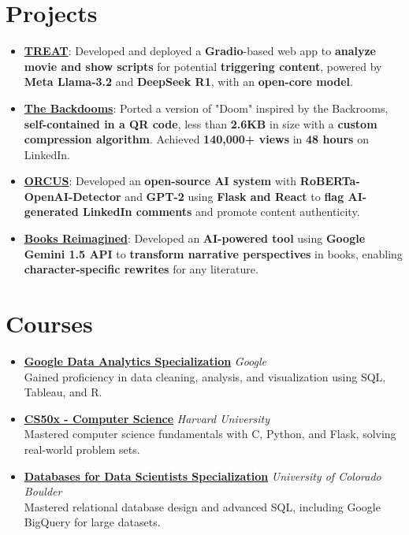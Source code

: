 \documentclass[letterpaper,11pt]{article}
\newcommand{\resumeItem}[2]{
  \item\small{
    \textbf{#1}{: #2 \vspace{-2pt}}
  }
}
\newcommand{\resumeSubHeadingListStart}{\begin{itemize}[leftmargin=*]}
\newcommand{\resumeSubHeadingListEnd}{\end{itemize}}
\begin{document}
\section*{Projects}
\resumeSubHeadingListStart
  \resumeItem{\href{https://trytreat.tech/}{TREAT}}{Developed and deployed a \textbf{Gradio}-based web app to \textbf{analyze movie and show scripts} for potential \textbf{triggering content}, powered by \textbf{Meta Llama-3.2} and \textbf{DeepSeek R1}, with an \textbf{open-core model}.}
  \resumeItem{\href{https://github.com/Kuberwastaken/backdooms}{The Backdooms}}{Ported a version of "Doom" inspired by the Backrooms, \textbf{self-contained in a QR code}, less than \textbf{2.6KB} in size with a \textbf{custom compression algorithm}. Achieved \textbf{140,000+ views} in \textbf{48 hours} on LinkedIn.}
  \resumeItem{\href{https://github.com/Kuberwastaken/ORCUS}{ORCUS}}{Developed an \textbf{open-source AI system} with \textbf{RoBERTa-OpenAI-Detector} and \textbf{GPT-2} using \textbf{Flask and React} to \textbf{flag AI-generated LinkedIn comments} and promote content authenticity.}
  \resumeItem{\href{https://www.kaggle.com/code/kubermehta/books-reimagined-diary-of-a-wimpy-kid-by-rodrick}{Books Reimagined}}{Developed an \textbf{AI-powered tool} using \textbf{Google Gemini 1.5 API} to \textbf{transform narrative perspectives} in books, enabling \textbf{character-specific rewrites} for any literature.}
\resumeSubHeadingListEnd

\section*{Courses}
\begin{itemize}[leftmargin=0.15in]
  \item \textbf{\href{https://www.coursera.org/account/accomplishments/specialization/AS9JOBALFZSL}{Google Data Analytics Specialization}} \hfill \textit{Google}\\
    Gained proficiency in data cleaning, analysis, and visualization using SQL, Tableau, and R.
  \item \textbf{\href{https://certificates.cs50.io/fe4b0a5a-c586-4a15-91ec-6b8a65f829e4.pdf?size=letter}{CS50x - Computer Science}} \hfill \textit{Harvard University}\\
    Mastered computer science fundamentals with C, Python, and Flask, solving real-world problem sets.
  \item \textbf{\href{https://www.coursera.org/account/accomplishments/specialization/GIPG5MXXA0FZ}{Databases for Data Scientists Specialization}} \hfill \textit{University of Colorado Boulder}\\
    Mastered relational database design and advanced SQL, including Google BigQuery for large datasets.
\end{itemize}
\end{document}
